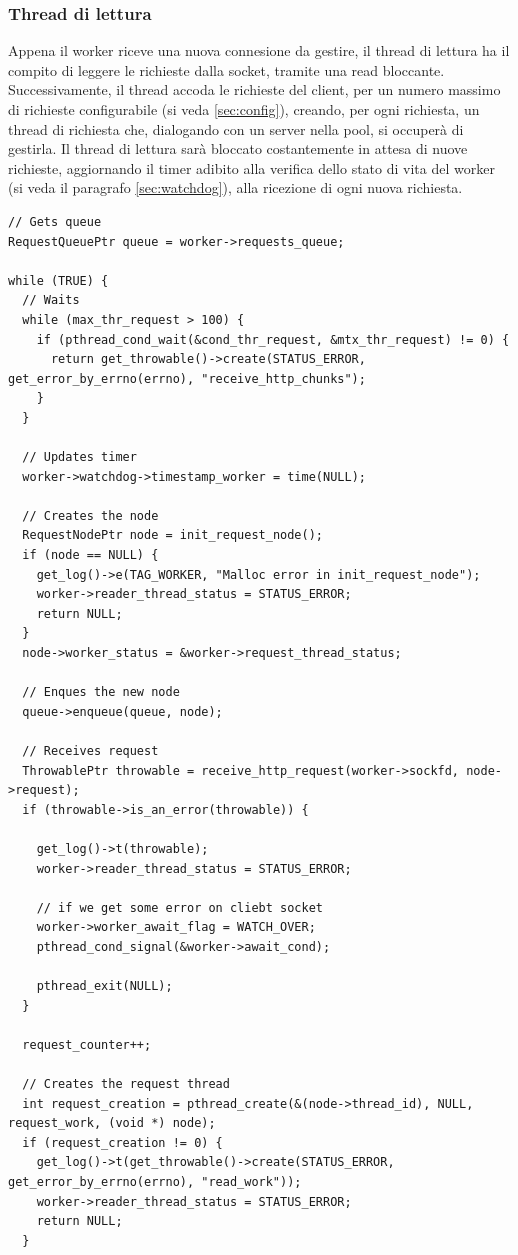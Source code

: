\documentclass[italian]{tktltiki2}
\begin{document}
\subsubsection{Thread di lettura}
\label{sec:reader}
Appena il worker riceve una nuova connesione da gestire, il thread di lettura ha il compito di leggere le richieste dalla socket, tramite una read bloccante. Successivamente, il thread accoda le richieste del client, per un numero massimo di richieste configurabile (si veda \ref{sec:config}), creando, per ogni richiesta, un thread di richiesta che, dialogando con un server nella pool, si occuperà di gestirla. Il thread di lettura sarà bloccato costantemente in attesa di nuove richieste, aggiornando il timer adibito alla verifica dello stato di vita del worker (si veda il paragrafo \ref{sec:watchdog}), alla ricezione di ogni nuova richiesta. 
\begin{lstlisting}
// Gets queue
RequestQueuePtr queue = worker->requests_queue;

while (TRUE) {
  // Waits
  while (max_thr_request > 100) {
    if (pthread_cond_wait(&cond_thr_request, &mtx_thr_request) != 0) {
      return get_throwable()->create(STATUS_ERROR, get_error_by_errno(errno), "receive_http_chunks");
    }
  }

  // Updates timer
  worker->watchdog->timestamp_worker = time(NULL);

  // Creates the node
  RequestNodePtr node = init_request_node();
  if (node == NULL) {
    get_log()->e(TAG_WORKER, "Malloc error in init_request_node");
    worker->reader_thread_status = STATUS_ERROR;
    return NULL;
  }
  node->worker_status = &worker->request_thread_status;

  // Enques the new node
  queue->enqueue(queue, node);

  // Receives request
  ThrowablePtr throwable = receive_http_request(worker->sockfd, node->request);
  if (throwable->is_an_error(throwable)) {

    get_log()->t(throwable);
    worker->reader_thread_status = STATUS_ERROR;

    // if we get some error on cliebt socket
    worker->worker_await_flag = WATCH_OVER;
    pthread_cond_signal(&worker->await_cond);

    pthread_exit(NULL);
  }

  request_counter++;

  // Creates the request thread
  int request_creation = pthread_create(&(node->thread_id), NULL, request_work, (void *) node);
  if (request_creation != 0) {
    get_log()->t(get_throwable()->create(STATUS_ERROR, get_error_by_errno(errno), "read_work"));
    worker->reader_thread_status = STATUS_ERROR;
    return NULL;
  }


\end{lstlisting}
\end{document}
